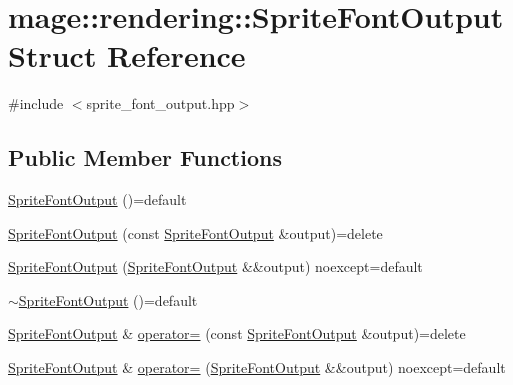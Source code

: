 \hypertarget{structmage_1_1rendering_1_1_sprite_font_output}{}\section{mage\+:\+:rendering\+:\+:Sprite\+Font\+Output Struct Reference}
\label{structmage_1_1rendering_1_1_sprite_font_output}


{\ttfamily \#include $<$sprite\+\_\+font\+\_\+output.\+hpp$>$}

\subsection*{Public Member Functions}
\begin{DoxyCompactItemize}
\item 
\hyperlink{structmage_1_1rendering_1_1_sprite_font_output_a5bc62257f436c6836a8fd0b3c306c026}{Sprite\+Font\+Output} ()=default
\item 
\hyperlink{structmage_1_1rendering_1_1_sprite_font_output_a304a4627f0aaacdb0f9dd0951421c8a2}{Sprite\+Font\+Output} (const \hyperlink{structmage_1_1rendering_1_1_sprite_font_output}{Sprite\+Font\+Output} \&output)=delete
\item 
\hyperlink{structmage_1_1rendering_1_1_sprite_font_output_a19714991b6c2e2aa842022b5c7e281cb}{Sprite\+Font\+Output} (\hyperlink{structmage_1_1rendering_1_1_sprite_font_output}{Sprite\+Font\+Output} \&\&output) noexcept=default
\item 
\hyperlink{structmage_1_1rendering_1_1_sprite_font_output_ac271cd1aa65291b2403555b8c230b702}{$\sim$\+Sprite\+Font\+Output} ()=default
\item 
\hyperlink{structmage_1_1rendering_1_1_sprite_font_output}{Sprite\+Font\+Output} \& \hyperlink{structmage_1_1rendering_1_1_sprite_font_output_a0b94e62b46d2b75d05eff13f8909f1cc}{operator=} (const \hyperlink{structmage_1_1rendering_1_1_sprite_font_output}{Sprite\+Font\+Output} \&output)=delete
\item 
\hyperlink{structmage_1_1rendering_1_1_sprite_font_output}{Sprite\+Font\+Output} \& \hyperlink{structmage_1_1rendering_1_1_sprite_font_output_aff107541c1b9a0fb3052a6ed0dbae7dd}{operator=} (\hyperlink{structmage_1_1rendering_1_1_sprite_font_output}{Sprite\+Font\+Output} \&\&output) noexcept=default
\end{DoxyCompactItemize}
